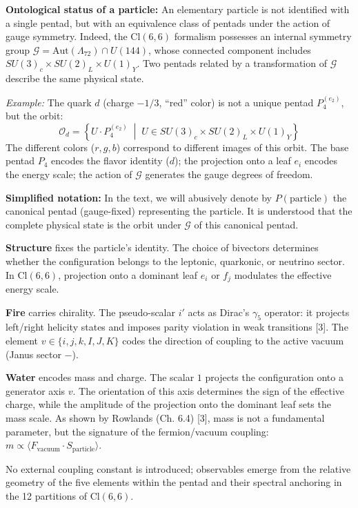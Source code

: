 \documentclass[11pt]{article}
\let\oldmathcal\mathcal
\renewcommand{\mathcal}[1]{\oldmathcal{#1}}
\begin{document}
\textbf{Ontological status of a particle:} An elementary particle is not
identified with a single pentad, but with an equivalence class of
pentads under the action of gauge symmetry. Indeed, the
\(\text{Cl}(6,6)\) formalism possesses an internal symmetry group
\(\mathcal{G} = \text{Aut}(\Lambda_{72}) \cap U(144)\), whose connected
component includes \(SU(3)_c \times SU(2)_L \times U(1)_Y\). Two pentads
related by a transformation of \(\mathcal{G}\) describe the same
physical state.

\emph{Example:} The quark \(d\) (charge \(-1/3\), ``red'' color) is not
a unique pentad \(P_4^{(e_2)}\), but the orbit:
\[\mathcal{O}_d = \left\{ U \cdot P_4^{(e_2)} \;\middle|\; U \in SU(3)_c \times SU(2)_L \times U(1)_Y \right\}\]
The different colors (\(r,g,b\)) correspond to different images of this
orbit. The base pentad \(P_4\) encodes the flavor identity (\(d\)); the
projection onto a leaf \(e_i\) encodes the energy scale; the action of
\(\mathcal{G}\) generates the gauge degrees of freedom.

\textbf{Simplified notation:} In the text, we will abusively denote by
\(P(\text{particle})\) the canonical pentad (gauge-fixed) representing
the particle. It is understood that the complete physical state is the
orbit under \(\mathcal{G}\) of this canonical pentad.

\textbf{Structure} fixes the particle's identity. The choice of
bivectors determines whether the configuration belongs to the leptonic,
quarkonic, or neutrino sector. In \(\text{Cl}(6,6)\), projection onto a
dominant leaf \(e_i\) or \(f_j\) modulates the effective energy scale.

\textbf{Fire} carries chirality. The pseudo-scalar \(i'\) acts as
Dirac's \(\gamma_5\) operator: it projects left/right helicity states
and imposes parity violation in weak transitions {[}3{]}. The element
\(v \in \{i,j,k,I,J,K\}\) codes the direction of coupling to the active
vacuum (Janus sector \(-\)).

\textbf{Water} encodes mass and charge. The scalar \(1\) projects the
configuration onto a generator axis \(v\). The orientation of this axis
determines the sign of the effective charge, while the amplitude of the
projection onto the dominant leaf sets the mass scale. As shown by
Rowlands (Ch. 6.4) {[}3{]}, mass is not a fundamental parameter, but the
signature of the fermion/vacuum coupling:
\(m \propto \langle F_{\text{vacuum}} \cdot S_{\text{particle}} \rangle\).

No external coupling constant is introduced; observables emerge from the
relative geometry of the five elements within the pentad and their
spectral anchoring in the 12 partitions of \(\text{Cl}(6,6)\).
\end{document}
